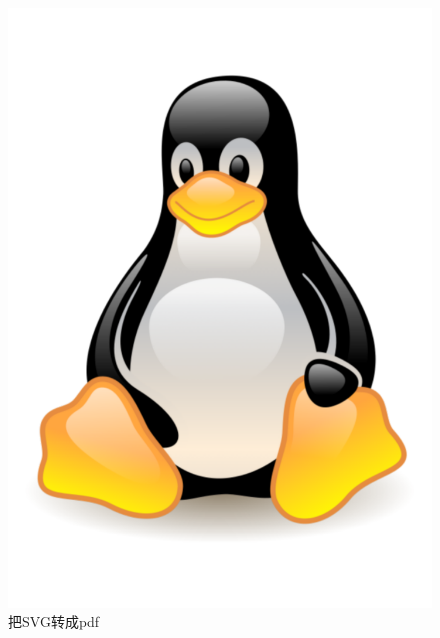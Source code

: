 \documentclass[12pt]{article} %
\begin{document}
\begin{figure}[!htb]
\centering
\includegraphics[width=1\linewidth]{NewTux.pdf}
\caption{把SVG转成pdf}
\label{fig:fig2}
\end{figure}
\end{document}
